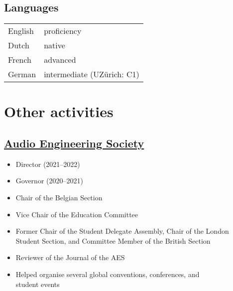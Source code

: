 \documentclass[letterpaper]{deedy-resume} %
\begin{document}
{\begin{minipage}[t]{0.33\textwidth}
\sectionspace %
\subsection{Languages}

\begin{tabular}{@{}ll}
English & proficiency\\
Dutch & native\\
French & advanced\\
German & intermediate (UZ\"{u}rich: C1)\\
\end{tabular}


\sectionspace %
\sectionspace %



\section{Other activities} 
\subsection{\href{http://www.aes.org}{Audio Engineering Society}}
\begin{itemize}[noitemsep,nolistsep,leftmargin=*]
\item Director (2021--2022)
\item Governor (2020--2021)
\item Chair of the Belgian Section
\item Vice Chair of the Education Committee
\item Former Chair of the Student Delegate Assembly, Chair of the London Student Section, and Committee Member of the British Section
\item Reviewer of the Journal of the AES
\item Helped organise several global conventions, conferences, and\\ student events
\end{itemize}


\end{minipage}}
\end{document}
